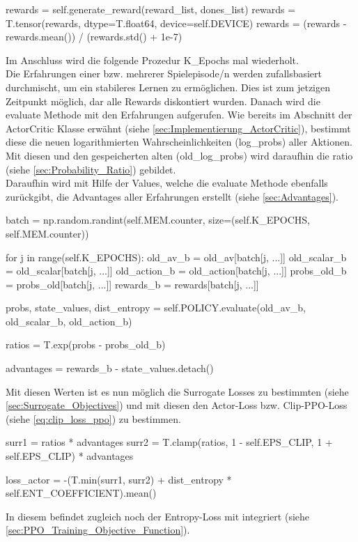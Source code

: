 \begin{python}
	rewards = self.generate_reward(reward_list, dones_list)
	rewards = T.tensor(rewards, dtype=T.float64, device=self.DEVICE)
	rewards = (rewards - rewards.mean()) / (rewards.std() + 1e-7)
\end{python}
Im Anschluss wird die folgende Prozedur K\_Epochs mal wiederholt.\\
Die Erfahrungen einer bzw. mehrerer Spielepisode/n werden zufallsbasiert durchmischt, um ein stabileres Lernen zu ermöglichen. Dies ist zum jetzigen Zeitpunkt möglich, dar alle Rewards diskontiert wurden. Danach wird die evaluate Methode mit den Erfahrungen aufgerufen. Wie bereits im Abschnitt der ActorCritic Klasse erwähnt (siehe \ref{sec:Implementierung_ActorCritic}), bestimmt diese die neuen logarithmierten Wahrscheinlichkeiten (log\_probs) aller Aktionen. Mit diesen und den gespeicherten alten (old\_log\_probs) wird daraufhin die ratio (siehe \ref{sec:Probability_Ratio}) gebildet.\\
Daraufhin wird mit Hilfe der Values, welche die evaluate Methode ebenfalls zurückgibt, die Advantages aller Erfahrungen erstellt (siehe \ref{sec:Advantages}).
\begin{python}
	batch = np.random.randint(self.MEM.counter, size=(self.K_EPOCHS, self.MEM.counter))
	
	for j in range(self.K_EPOCHS):
		old_av_b = old_av[batch[j, ...]]
		old_scalar_b = old_scalar[batch[j, ...]]
		old_action_b = old_action[batch[j, ...]]
		probs_old_b = probs_old[batch[j, ...]]
		rewards_b = rewards[batch[j, ...]]
		
		probs, state_values, dist_entropy = self.POLICY.evaluate(old_av_b, old_scalar_b, old_action_b)
		
		ratios = T.exp(probs - probs_old_b)
		
		advantages = rewards_b - state_values.detach()
\end{python}
Mit diesen Werten ist es nun möglich die Surrogate Losses zu bestimmten (siehe \ref{sec:Surrogate_Objectives}) und mit diesen den Actor-Loss bzw. Clip-PPO-Loss (siehe \ref{eq:clip_loss_ppo}) zu bestimmen.
\begin{python}
	surr1 = ratios * advantages
	surr2 = T.clamp(ratios, 1 - self.EPS_CLIP, 1 + self.EPS_CLIP) * advantages
	
	loss_actor = -(T.min(surr1, surr2) + dist_entropy * 
							 self.ENT_COEFFICIENT).mean()
\end{python}
In diesem befindet zugleich noch der Entropy-Loss mit integriert (siehe \ref{sec:PPO_Training_Objective_Function}).
